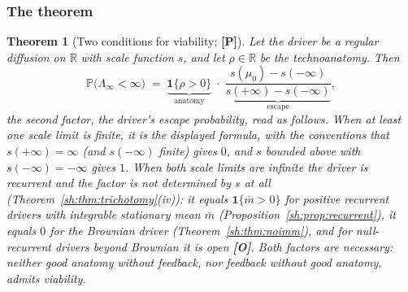 \documentclass[11pt]{article}
\numberwithin{equation}{section}
\theoremstyle{plain}
\newtheorem{theorem}{Theorem}[section]
\theoremstyle{definition}
\theoremstyle{remark}
\newcommand{\PP}{\mathbb{P}}
\newcommand{\R}{\mathbb{R}}
\newcommand{\one}{\mathbf{1}}
\begin{document}
\subsubsection{The theorem}\label{gr1:subsub:twocondthm}

\begin{theorem}[Two conditions for viability; \textbf{[P]}]
\label{gr1:thm:twocond}
Let the driver be a regular diffusion on $\R$ with scale function $s$,
and let $\rho\in\R$ be the technoanatomy. Then
\begin{equation}\label{gr1:eq:twocond}
\PP\bigl(\Lambda_\infty<\infty\bigr)
\;=\;
\underbrace{\one\{\rho>0\}}_{\text{anatomy}}
\;\cdot\;
\underbrace{\frac{s(\mu_0)-s(-\infty)}{s(+\infty)-s(-\infty)}}
_{\text{escape}},
\end{equation}
the second factor, the driver's \emph{escape probability}, read
as follows. When at least one scale limit is finite, it is the
displayed formula, with the conventions that $s(+\infty)=\infty$
(and $s(-\infty)$ finite) gives $0$, and $s$ bounded above with
$s(-\infty)=-\infty$ gives $1$. When \emph{both} scale limits are
infinite the driver is recurrent and the factor is not determined by
$s$ at all (Theorem~\ref{sh:thm:trichotomy}(iv)): it equals
$\one\{\bar m>0\}$ for positive recurrent drivers with integrable
stationary mean $\bar m$ (Proposition~\ref{sh:prop:recurrent}), it
equals $0$ for the Brownian driver (Theorem~\ref{sh:thm:noimm}), and
for null-recurrent drivers beyond Brownian it is open \textbf{[O]}.
Both factors are necessary: neither good anatomy without feedback, nor
feedback without good anatomy, admits viability.
\end{theorem}
\end{document}
